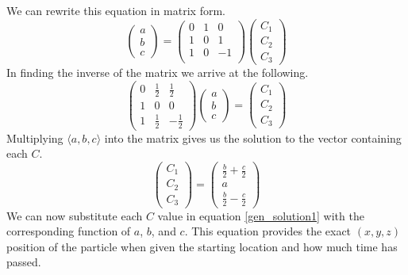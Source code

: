 \documentclass[a4paper]{article}
\newcommand{\myvec}[1]{\langle#1\rangle}
\begin{document}
We can rewrite this equation in matrix form.
\begin{equation*}
	\begin{pmatrix} a \\ b \\ c \end{pmatrix} = \begin{pmatrix}
	0 & 1 & 0 \\
	1 & 0 & 1 \\
	1 & 0 & -1 \\ \end{pmatrix}
	\begin{pmatrix} C_1 \\ C_2 \\ C_3 \end{pmatrix}
\end{equation*}
In finding the inverse of the matrix we arrive at the following.
\begin{equation*}
	\begin{pmatrix}
		0 & \frac{1}{2} & \frac{1}{2} \\
		1 & 0 & 0 \\
		1 & \frac{1}{2} & -\frac{1}{2} \end{pmatrix}
		\begin{pmatrix} a \\ b \\ c \end{pmatrix} 
	= \begin{pmatrix} C_1 \\ C_2 \\ C_3 \end{pmatrix}
\end{equation*}
Multiplying $\myvec{a,b,c}$ into the matrix gives us the solution to the vector containing each $C$.
\begin{equation}
	\begin{pmatrix} C_1 \\ C_2 \\ C_3 \end{pmatrix} =
	\begin{pmatrix} \frac{b}{2}+\frac{c}{2} \\ a \\ \frac{b}{2}-\frac{c}{2} \end{pmatrix}
	\label{C_solutions}
\end{equation}
We can now substitute each $C$ value in equation \ref{gen_solution1} with the corresponding function of $a$, $b$, and $c$. This equation provides the exact $(x,y,z)$ position of the particle when given the starting location and how much time has passed.
\end{document}
